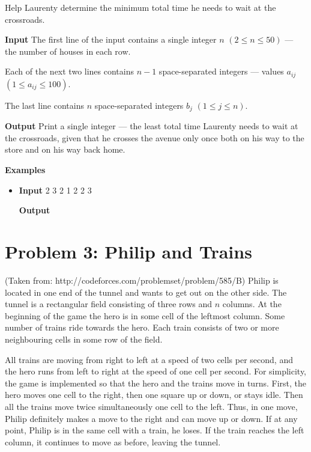 \normalfont\documentclass[letterpaper,11pt]{article}
\begin{document}
Help Laurenty determine the minimum total time he needs to wait at the crossroads.

\textbf{Input} \newline
The first line of the input contains a single integer $n$ $(2 \leq n \leq 50)$ — the number of houses in each row.

Each of the next two lines contains $n - 1$ space-separated integers — values $a_{ij}$ $(1 \leq a_{ij} \leq 100)$.

The last line contains $n$ space-separated integers $b_j$ $(1 \leq j \leq n)$.

\textbf{Output} \newline
Print a single integer — the least total time Laurenty needs to wait at the crossroads, given that he crosses the avenue only once both on his way to the store and on his way back home.

\textbf{Examples}
\begin{itemize}
\item \textbf{Input}   2 3  2 1  2 2 3

\textbf{Output} 

\end{itemize}

\newpage

\section*{Problem 3: Philip and Trains}
(Taken from: http://codeforces.com/problemset/problem/585/B) \newline
Philip is located in one end of the tunnel and wants to get out on the other side. The tunnel is a rectangular field consisting of three rows and $n$ columns. At the beginning of the game the hero is in some cell of the leftmost column. Some number of trains ride towards the hero. Each train consists of two or more neighbouring cells in some row of the field.

All trains are moving from right to left at a speed of two cells per second, and the hero runs from left to right at the speed of one cell per second. For simplicity, the game is implemented so that the hero and the trains move in turns. First, the hero moves one cell to the right, then one square up or down, or stays idle. Then all the trains move twice simultaneously one cell to the left. Thus, in one move, Philip definitely makes a move to the right and can move up or down. If at any point, Philip is in the same cell with a train, he loses. If the train reaches the left column, it continues to move as before, leaving the tunnel.
\end{document}
